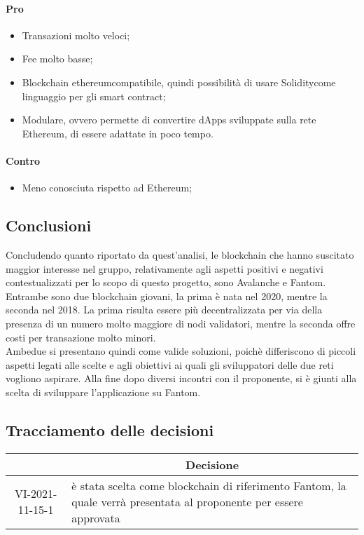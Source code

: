 		\paragraph{Pro}
		\begin{itemize}
			\item Transazioni molto veloci;
			\item Fee molto basse;
			\item Blockchain ethereum\glo compatibile, quindi possibilità di usare Solidity\glo come linguaggio per gli smart contract;
			\item Modulare, ovvero permette di convertire dApps sviluppate sulla rete Ethereum\glo, di essere adattate in poco tempo.
		\end{itemize}
		\paragraph{Contro}
		\begin{itemize}
			\item Meno conosciuta rispetto ad Ethereum\glo;
		\end{itemize}
	
	\subsection{Conclusioni}
	Concludendo quanto riportato da quest'analisi, le blockchain che hanno suscitato maggior interesse nel gruppo, relativamente agli aspetti positivi e negativi contestualizzati per lo scopo di questo progetto,
	sono Avalanche e Fantom. Entrambe sono due blockchain giovani, la prima è nata nel 2020, mentre la seconda nel 2018. La prima risulta essere più decentralizzata per via della presenza di un numero molto maggiore di nodi validatori, mentre la seconda
	offre costi per transazione molto minori.\\
	Ambedue si presentano quindi come valide soluzioni, poichè differiscono di piccoli aspetti legati alle scelte e agli obiettivi ai quali gli sviluppatori delle due reti vogliono aspirare. Alla fine dopo diversi incontri con il proponente, si è giunti
	alla scelta di sviluppare l'applicazione su Fantom.

\pagebreak

\subsection{Tracciamento delle decisioni}

\begin{table}[H]
	\centering
	\renewcommand{\arraystretch}{1.8}
	\begin{tabular}{c | p{10cm}}
		\rowcolor[HTML]{125E28}
		\multicolumn{1}{c}{\color[HTML]{FFFFFF} \textbf{ID}} &
		\multicolumn{1}{c}{\color[HTML]{FFFFFF} \textbf{Decisione}} \\
		\hline
		VI-2021-11-15-1 & è stata scelta come blockchain di riferimento Fantom, la quale verrà presentata al proponente per essere approvata\\ \hline
	\end{tabular}
\end{table}
